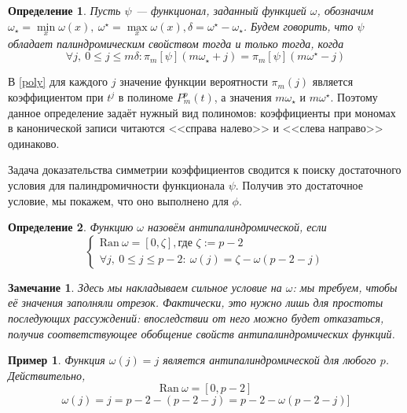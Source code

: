 \documentclass[14pt, a4paper, russian]{report}
\newtheorem{remark}{\indent Замечание}
\newtheorem{definition}{\indent Определение}
\newtheorem{example}{\indent Пример}
\begin{document}
\begin{definition}\label{palindromic}
Пусть $\psi$ --- функционал, заданный функцией $\omega$, обозначим $\omega_\star = \min\limits_x \omega(x),\ \omega^\star = \max\limits_x \omega(x), \delta=\omega^\star - \omega_\star$. Будем говорить, что  $\psi$  \emph{обладает палиндромическим свойством} тогда и только тогда, когда
$$
\forall j,\ 0 \le j \le m\delta:   \pi_m[\psi](m\omega_\star + j)=\pi_m[\psi](m\omega^\star-j)
$$
\end{definition}

В \cref{poly} для каждого $j$ значение функции вероятности $\pi_m(j)$ является коэффициентом при $t^j$ в полиноме $P_m^p(t)$, а значения $m\omega_\star$ и $m\omega^\star$. Поэтому данное определение задаёт нужный вид полиномов: коэффициенты при мономах в канонической записи читаются <<справа налево>> и <<слева направо>> одинаково.

Задача доказательства симметрии коэффициентов сводится к поиску достаточного условия для палиндромичности функционала $\psi$. Получив это достаточное условие, мы покажем, что оно выполнено для $\phi$.

\begin{definition}\label{antipalindromic}
Функцию $\omega$ назовём \emph{антипалиндромической}, если
\[\begin{cases}
	\mathrm{Ran }\ \omega = \left[0, \zeta\right], \text{где } \zeta := p-2 \\
	\forall j,\ 0 \le j \le p-2: \  \omega(j) = \zeta - \omega(p-2-j)
\end{cases}\]
\end{definition}
\begin{remark}
Здесь мы накладываем сильное условие на $\omega$: мы требуем, чтобы её значения заполняли отрезок. Фактически, это нужно лишь для простоты последующих рассуждений: впоследствии от него можно будет отказаться, получив соответствующее обобщение свойств антипалиндромических функций.
\end{remark}


\begin{example} \label{classic_omega}
Функция $\omega(j)=j$ является антипалиндромической для любого $p$. Действительно,
$$
\mathrm{Ran }\ \omega = \left[0, p-2\right]
$$
$$
\omega(j) = j = p-2 - (p-2-j) = p-2 - \omega(p-2-j)]
$$
\end{example}
\end{document}
